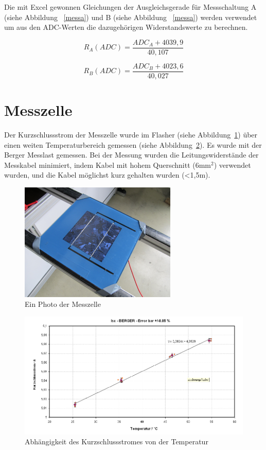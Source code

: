 \documentclass[a4paper,bibtotoc,oneside]{scrbook}
\begin{document}
Die mit Excel gewonnen Gleichungen der Ausgleichsgerade für Messschaltung A (siehe Abbildung ~\ref{messa}) und B (siehe Abbildung ~\ref{messa}) werden verwendet um aus den ADC-Werten die dazugehörigen Widerstandswerte zu berechnen. 

  \begin{equation}
     R_A(ADC) = \frac{ADC_A + 4039,9}{40,107}
  \end{equation}
  
    \begin{equation}
     R_B(ADC) = \frac{ADC_B + 4023,6}{40,027}
  \end{equation}


\section{Messzelle}\thispagestyle{empty}


Der Kurzschlussstrom der Messzelle wurde im Flasher (siehe Abbildung~\ref{zelleflasher}) über einen weiten Temperaturbereich gemessen (siehe Abbildung~\ref{tempkoef}). Es wurde mit der Berger Messlast \cite{berger} gemessen. Bei der Messung wurden die Leitungswiderstände der Messkabel minimiert, indem Kabel mit hohem Querschnitt (6mm$^2$) verwendet wurden, und die Kabel möglichst kurz gehalten wurden (<1,5m).
 
\begin{figure}[htbp]
\centering
\includegraphics[width=75mm]{img/zelle.jpg}
\caption{Ein Photo der Messzelle}\label{zelleflasher}
\end{figure}

\begin{figure}[htbp]
\centering
\includegraphics[width=150mm]{img/Isc.png}
\caption{Abhängigkeit des Kurzschlussstromes von der Temperatur}\label{tempkoef}
\end{figure}
\end{document}
